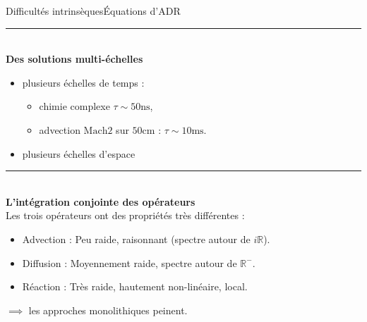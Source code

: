 \begin{frame}{Difficultés intrinsèques}{Équations d'ADR}

    \noindent\color{Primary}\rule{\linewidth}{0.6pt}\color{black}\\
    \textbf{Des solutions multi-échelles}\\[0.5em]
    \begin{itemize}
        \item plusieurs échelles de temps :\\
        \begin{itemize}
            \item chimie complexe $\tau \sim 50\mathrm{ns}$,\\
            \item advection $\mathrm{Mach }2$ sur $50\mathrm{cm}$ : $\tau \sim 10\mathrm{ms}$.
        \end{itemize}
        \item plusieurs échelles d'espace
    \end{itemize}\pause
    \noindent\color{Primary}\rule{\linewidth}{0.6pt}\color{black}\\
    \textbf{L'intégration conjointe des opérateurs}\\[0.5em]
    Les trois opérateurs ont des propriétés très différentes :
    \begin{itemize}
        \item Advection : Peu raide, raisonnant (spectre autour de $i\mathbb R$).
        \item Diffusion : Moyennement raide, spectre autour de $\mathbb R^-$.
        \item Réaction :  Très raide, hautement non-linéaire, local.
    \end{itemize}
    $\implies$ les approches monolithiques peinent.
\end{frame}
